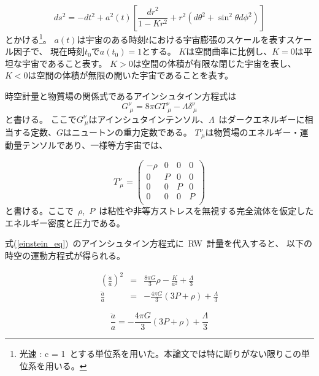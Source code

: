 \begin{equation}
  ds^2 = -dt^2 + a^2(t) \left[\frac{dr^2}{1-Kr^2} + r^2(d{\theta}^2 + \sin^2{\theta}d{\phi}^2)\right]
  \label{flrw}
\end{equation}
とかける\footnote{光速 : c = 1~とする単位系を用いた。本論文では特に断りがない限りこの単位系を用いる。}。
$a(t)$は宇宙のある時刻$t$における宇宙膨張のスケールを表すスケール因子で、
現在時刻$t_0$で$a(t_0) = 1$とする。
$K$は空間曲率に比例し、$K=0$は平坦な宇宙であること表す。
$K>0$は空間の体積が有限な閉じた宇宙を表し、$K<0$は空間の体積が無限の開いた宇宙であることを表す。

時空計量と物質場の関係式であるアインシュタイン方程式は
\begin{equation}
  G^{\nu}_{~\mu} = 8{\pi}GT^{\nu}_{~\mu} - \Lambda\delta^{\nu}_{~\mu}
  \label{einstein_eq}
\end{equation}
と書ける。
ここで$G^{\nu}_{~\mu}$はアインシュタインテンソル、$\Lambda$~はダークエネルギーに相当する定数、$G$はニュートンの重力定数である。
$T^{\nu}_{~\mu}$は物質場のエネルギー・運動量テンソルであり、一様等方宇宙では、

\begin{equation}
  T^{\nu}_{~\mu} = \left(
    \begin{array}{cccc}
      -\rho & 0 & 0 & 0 \\
      0 & P & 0 & 0 \\
      0 & 0 & P & 0 \\
      0 & 0 & 0 & P \\
    \end{array}
  \right) 
  \label{energy_momentum}
\end{equation}
と書ける。ここで~$\rho$,~$P$~は粘性や非等方ストレスを無視する完全流体を仮定したエネルギー密度と圧力である。

式(\ref{einstein_eq})~のアインシュタイン方程式に~RW~計量を代入すると、
以下の時空の運動方程式が得られる。

\begin{eqnarray}
  \label{energy_eq1}
  \left(\frac{\dot{a}}{a}\right)^2 &=& \frac{8\pi G}{3}\rho -\frac{K}{a^2} + \frac{\Lambda}{3}　\\
  \label{friedmann_eq} 
  \frac{\ddot{a}}{a} &=& -\frac{4 \pi G}{3}(3P + \rho) +\frac{\Lambda}{3}
\end{eqnarray}

\begin{equation}
  \frac{\ddot{a}}{a} = -\frac{4 \pi G}{3}(3P + \rho) +\frac{\Lambda}{3}
  \label{energy_eq1}
\end{equation}
\fi

